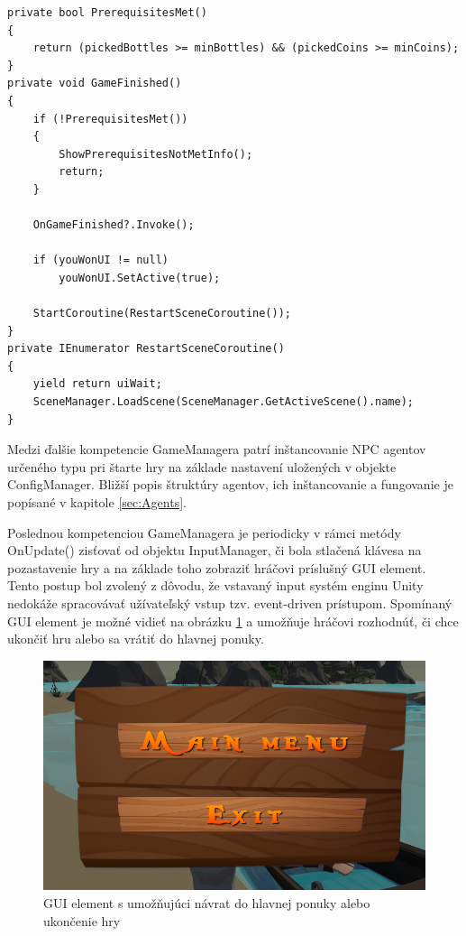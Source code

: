 \documentclass[slovak, master]{diploma}
\begin{document}
\vspace{8pt}
\begin{lstlisting}[label=src:FinishGame,caption={Ukončenie hry v prípade výhry hráča}]
private bool PrerequisitesMet()
{
    return (pickedBottles >= minBottles) && (pickedCoins >= minCoins);
}
private void GameFinished()
{
    if (!PrerequisitesMet())
    {
        ShowPrerequisitesNotMetInfo();
        return;
    }

    OnGameFinished?.Invoke();

    if (youWonUI != null)
        youWonUI.SetActive(true);

    StartCoroutine(RestartSceneCoroutine());
}
private IEnumerator RestartSceneCoroutine()
{
    yield return uiWait;
    SceneManager.LoadScene(SceneManager.GetActiveScene().name);
}
\end{lstlisting}

Medzi ďalšie kompetencie GameManagera patrí inštancovanie NPC agentov určeného typu pri štarte hry na základe nastavení uložených v objekte ConfigManager. Bližší popis štruktúry agentov, ich inštancovanie a fungovanie je popísané v kapitole \ref{sec:Agents}.

Poslednou kompetenciou GameManagera je periodicky v rámci metódy OnUpdate() zisťovať od objektu InputManager, či bola stlačená klávesa na pozastavenie hry a na základe toho zobraziť hráčovi príslušný GUI element. Tento postup bol zvolený z dôvodu, že vstavaný input systém enginu Unity nedokáže spracovávať užívateľský vstup tzv. event-driven prístupom. Spomínaný GUI element je možné vidieť na obrázku \ref{pic:PauseUI} a umožňuje hráčovi rozhodnúť, či chce ukončiť hru alebo sa vrátiť do hlavnej ponuky. 

\begin{figure}[!htbp]
    \centering
    \includegraphics[width=.65\textwidth]{Figures/pauseUI.png}
    \caption{GUI element s umožňujúci návrat do hlavnej ponuky alebo ukončenie hry}
    \label{pic:PauseUI}
\end{figure}
\end{document}
